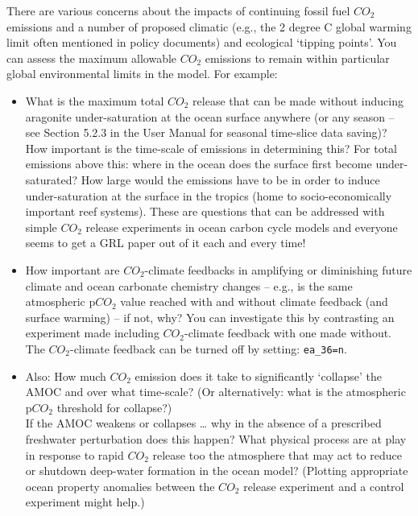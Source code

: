 \documentclass[11pt,fleqn]{book} %
\begin{document}
There are various concerns about the impacts of continuing fossil fuel \(CO_{2}\) emissions and a number of proposed climatic (e.g., the 2 degree C global warming limit often mentioned in policy documents) and ecological ‘tipping points’. You can assess the maximum allowable \(CO_{2}\) emissions to remain within particular global environmental limits in the model. For example:

\begin{itemize}[noitemsep]

\vspace{1mm}
\item What is the maximum total \(CO_{2}\) release that can be made without inducing aragonite under-saturation at the ocean surface anywhere (or any season – see Section 5.2.3 in the User Manual for seasonal time-slice data saving)? How important is the time-scale of emissions in determining this? For total emissions above this: where in the ocean does the surface first become under-saturated? How large would the emissions have to be in order to induce under-saturation at the surface in the tropics (home to socio-economically important reef systems). These are questions that can be addressed with simple \(CO_{2}\) release experiments in ocean carbon cycle models and everyone seems to get a GRL paper out of it each and every time!

\vspace{1mm}
\item How important are \(CO_{2}\)-climate feedbacks in amplifying or diminishing future climate and ocean carbonate chemistry changes – e.g., is the same atmospheric p\(CO_{2}\) value reached with and without climate feedback (and surface warming) – if not, why? You can investigate this by contrasting an experiment made including \(CO_{2}\)-climate feedback with one made without. The \(CO_{2}\)-climate feedback can be turned off by setting: \texttt{ea\_36=n}.

\vspace{1mm}
\item Also: How much \(CO_{2}\) emission does it take to significantly ‘collapse’ the AMOC and over what time-scale? (Or alternatively: what is the atmospheric p\(CO_{2}\) threshold for collapse?)
\\ If the AMOC weakens or collapses … why in the absence of a prescribed freshwater perturbation does this happen? What physical process are at play in response to rapid \(CO_{2}\) release too the atmosphere that may act to reduce or shutdown deep-water formation in the ocean model? (Plotting appropriate ocean property anomalies between the \(CO_{2}\) release experiment and a control experiment might help.)

\end{itemize}
\end{document}
